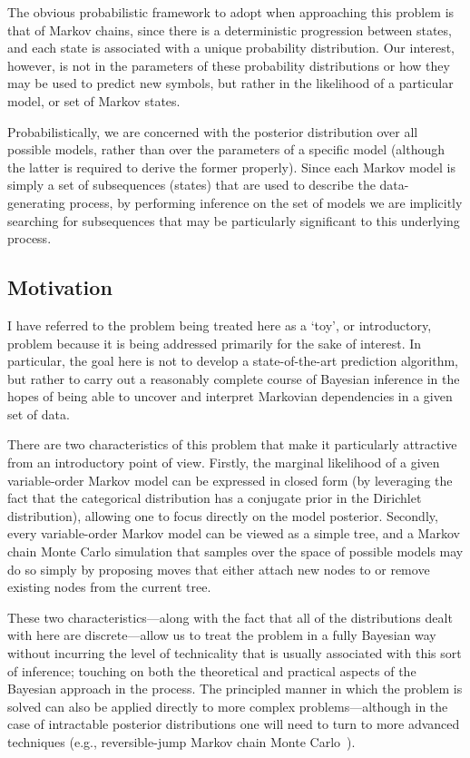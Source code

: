 \documentclass[11pt,a4paper]{article}
\begin{document}
The obvious probabilistic framework to adopt when approaching this problem is
that of Markov chains, since there is a deterministic progression between
states, and each state is associated with a unique probability distribution. Our
interest, however, is not in the parameters of these probability distributions
or how they may be used to predict new symbols, but rather in the likelihood of
a particular model, or set of Markov states.

Probabilistically, we are concerned with the posterior distribution over all
possible models, rather than over the parameters of a specific model (although
the latter is required to derive the former properly). Since each Markov model
is simply a set of subsequences (states) that are used to describe the
data-generating process, by performing inference on the set of models we are
implicitly searching for subsequences that may be particularly significant to
this underlying process.

\subsection{Motivation} %

I have referred to the problem being treated here as a `toy', or introductory,
problem because it is being addressed primarily for the sake of interest. In
particular, the goal here is not to develop a state-of-the-art prediction
algorithm, but rather to carry out a reasonably complete course of Bayesian
inference in the hopes of being able to uncover and interpret Markovian
dependencies in a given set of data.

There are two characteristics of this problem that make it particularly
attractive from an introductory point of view. Firstly, the marginal likelihood
of a given variable-order Markov model can be expressed in closed form (by
leveraging the fact that the categorical distribution has a conjugate prior in
the Dirichlet distribution), allowing one to focus directly on the model
posterior. Secondly, every variable-order Markov model can be viewed as a simple
tree, and a Markov chain Monte Carlo simulation that samples over the space of
possible models may do so simply by proposing moves that either attach new nodes
to or remove existing nodes from the current tree.

These two characteristics---along with the fact that all of the distributions
dealt with here are discrete---allow us to treat the problem in a fully Bayesian
way without incurring the level of technicality that is usually associated with
this sort of inference; touching on both the theoretical and practical aspects
of the Bayesian approach in the process. The principled manner in which the
problem is solved can also be applied directly to more complex
problems---although in the case of intractable posterior distributions one will
need to turn to more advanced techniques (e.g., reversible-jump Markov chain
Monte Carlo~\cite{green1995reversible}). 
\end{document}
